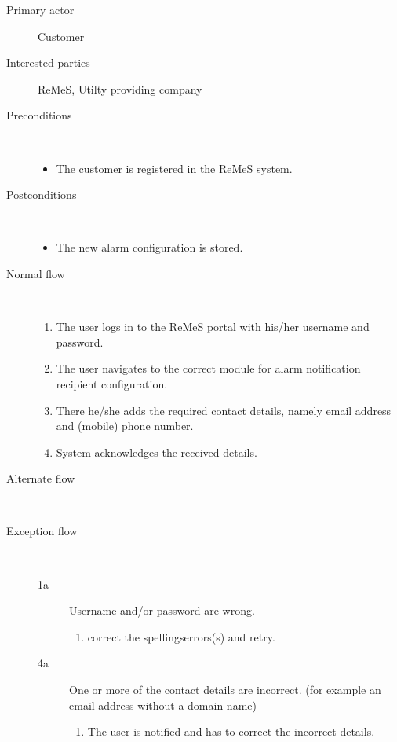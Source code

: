 \begin{description}
	\item[Primary actor] Customer
	\item[Interested parties] ReMeS, Utilty providing company
	\item[Preconditions] \ 
	\begin{itemize}
		\item The customer is registered in the ReMeS system.
	\end{itemize}
	\item[Postconditions] \ 
	\begin{itemize}
		\item The new alarm configuration is stored.
	\end{itemize}
	\item[Normal flow] \ 
	\begin{enumerate}
	  	\item The user logs in to the ReMeS portal with his/her username and
	  	password.
	  	\item The user navigates to the correct module for alarm
	  	notification recipient configuration.
	  	\item There he/she adds the required contact details, namely email address
	  	and (mobile) phone number.
	  	\item System acknowledges the received details.
	\end{enumerate}
	\item[Alternate flow] \ 
	\begin{description}
		\item
	\end{description}
	\item[Exception flow] \ 
	\begin{description}
		\item[1a] Username and/or password are wrong.
		\begin{enumerate}
		  \item correct the spellingserrors(s) and retry.
		\end{enumerate}
		\item[4a] One or more of the contact details are incorrect. (for example an
		email address without a domain name)
		\begin{enumerate}
		  \item The user is notified and has to correct the incorrect details.
		\end{enumerate}
	\end{description}
\end{description}

